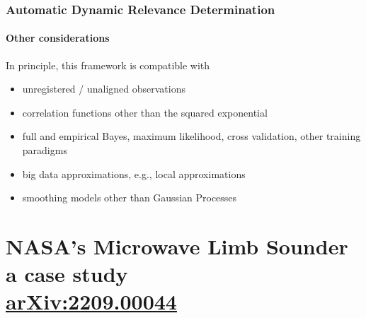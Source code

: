 \documentclass{snedecorbeamer}
\begin{document}
\begin{frame}
  \frametitle{Automatic Dynamic Relevance Determination}
  \framesubtitle{Other considerations}

  In principle, this framework is compatible with
  \begin{itemize}
  \item unregistered / unaligned observations
  \item correlation functions other than the squared exponential
  \item full and empirical Bayes, maximum likelihood, cross validation,
    other training paradigms
  \item big data approximations, e.g., local approximations
  \item smoothing models other than Gaussian Processes
  \end{itemize}
\end{frame}

\section{NASA's Microwave Limb Sounder \\ {\small a case study} \\
  {\tiny
    \href{https://doi.org/10.48550/arXiv.2209.00044}{arXiv:2209.00044}}}
\end{document}
